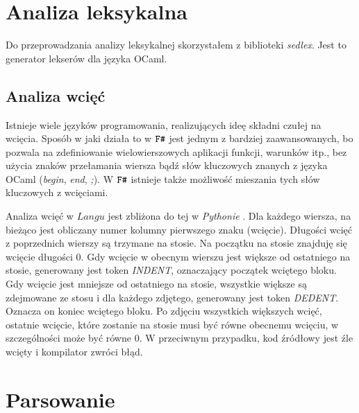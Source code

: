 \documentclass[declaration,shortabstract]{iithesis}
\begin{document}


\section{Analiza leksykalna}

Do przeprowadzania analizy leksykalnej skorzystałem z biblioteki 
\textit{sedlex}. Jest to generator lekserów dla języka OCaml.

\subsection{Analiza wcięć} \label{wciecia_omowienie}
 
Istnieje wiele języków programowania, realizujących ideę składni czułej na 
wcięcia. Sposób w jaki działa to w $\verb!F#!$ jest jednym z bardziej zaawansowanych,
bo pozwala na zdefiniowanie wielowierszowych aplikacji funkcji, warunków itp., 
bez użycia znaków przełamania wiersza bądź słów kluczowych znanych 
z języka OCaml (\textit{begin}, \textit{end}, \textit{;}). W $\verb!F#!$ istnieje 
także możliwość mieszania tych słów kluczowych z wcięciami. 

Analiza wcięć w $Langu$ jest zbliżona do tej w \textit{Pythonie}
\cite{python_indentation}. Dla każdego wiersza, 
na bieżąco jest obliczany numer kolumny pierwszego znaku (wcięcie). Długości 
wcięć z poprzednich wierszy są trzymane na stosie. Na początku na stosie
znajduję się wcięcie długości 0. Gdy wcięcie w obecnym wierszu jest większe od 
ostatniego na stosie, generowany jest token \textit{INDENT}, oznaczający 
początek wciętego bloku. Gdy wcięcie jest mniejsze od ostatniego na stosie, 
wszystkie większe są zdejmowane ze stosu i dla każdego zdjętego, generowany 
jest token \textit{DEDENT}. Oznacza on koniec wciętego bloku. Po zdjęciu 
wszystkich większych wcięć, ostatnie wcięcie, które zostanie na stosie musi być 
równe obecnemu wcięciu, w szczególności może być równe $0$. W przeciwnym 
przypadku, kod źródłowy jest źle wcięty i kompilator zwróci błąd.

\section{Parsowanie}
\end{document}
